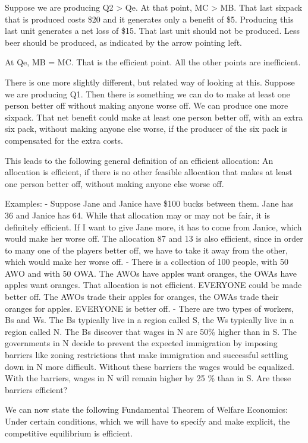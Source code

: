\documentclass[
]{book}
\begin{document}
Suppose we are producing Q2 \textgreater{} Qe. At that point, MC \textgreater{} MB. That last sixpack that is produced costs \$20 and it generates only a benefit of \$5. Producing this last unit generates a net loss of \$15. That last unit should not be produced. Less beer should be produced, as indicated by the arrow pointing left.

At Qe, MB = MC. That is the efficient point. All the other points are inefficient.

There is one more slightly different, but related way of looking at this. Suppose we are producing Q1. Then there is something we can do to make at least one person better off without making anyone worse off. We can produce one more sixpack. That net benefit could make at least one person better off, with an extra six pack, without making anyone else worse, if the producer of the six pack is compensated for the extra costs.

This leads to the following general definition of an efficient allocation: An allocation is efficient, if there is no other feasible allocation that makes at least one person better off, without making anyone else worse off.

Examples:
- Suppose Jane and Janice have \$100 bucks between them. Jane has 36 and Janice has 64. While that allocation may or may not be fair, it is definitely efficient. If I want to give Jane more, it has to come from Janice, which would make her worse off. The allocation 87 and 13 is also efficient, since in order to many one of the players better off, we have to take it away from the other, which would make her worse off.
- There is a collection of 100 people, with 50 AWO and with 50 OWA. The AWOs have apples want oranges, the OWAs have apples want oranges. That allocation is not efficient. EVERYONE could be made better off. The AWOs trade their apples for oranges, the OWAs trade their oranges for apples. EVERYONE is better off.
- There are two types of workers, Bs and Ws. The Bs typically live in a region called S, the Ws typically live in a region called N. The Bs discover that wages in N are 50\% higher than in S. The governments in N decide to prevent the expected immigration by imposing barriers like zoning restrictions that make immigration and successful settling down in N more difficult. Without these barriers the wages would be equalized. With the barriers, wages in N will remain higher by 25 \% than in S. Are these barriers efficient?

We can now state the following
Fundamental Theorem of Welfare Economics: Under certain conditions, which we will have to specify and make explicit, the competitive equilibrium is efficient.
\end{document}
